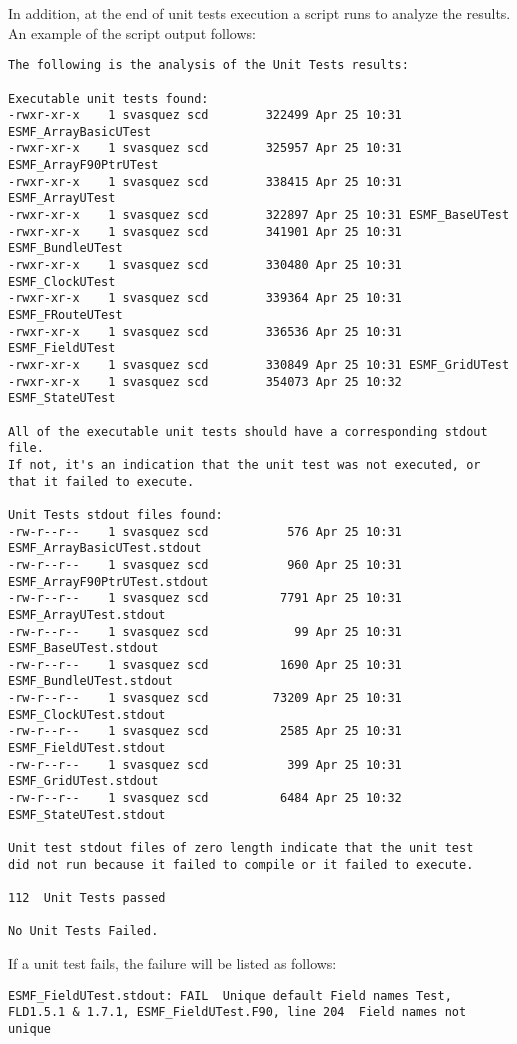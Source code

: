 In addition, at the end of unit tests execution a script runs to analyze the results.
An example of the script output follows:
\begin{verbatim}
The following is the analysis of the Unit Tests results:

Executable unit tests found:
-rwxr-xr-x    1 svasquez scd        322499 Apr 25 10:31 ESMF_ArrayBasicUTest
-rwxr-xr-x    1 svasquez scd        325957 Apr 25 10:31 ESMF_ArrayF90PtrUTest
-rwxr-xr-x    1 svasquez scd        338415 Apr 25 10:31 ESMF_ArrayUTest
-rwxr-xr-x    1 svasquez scd        322897 Apr 25 10:31 ESMF_BaseUTest
-rwxr-xr-x    1 svasquez scd        341901 Apr 25 10:31 ESMF_BundleUTest
-rwxr-xr-x    1 svasquez scd        330480 Apr 25 10:31 ESMF_ClockUTest
-rwxr-xr-x    1 svasquez scd        339364 Apr 25 10:31 ESMF_FRouteUTest
-rwxr-xr-x    1 svasquez scd        336536 Apr 25 10:31 ESMF_FieldUTest
-rwxr-xr-x    1 svasquez scd        330849 Apr 25 10:31 ESMF_GridUTest
-rwxr-xr-x    1 svasquez scd        354073 Apr 25 10:32 ESMF_StateUTest

All of the executable unit tests should have a corresponding stdout file.
If not, it's an indication that the unit test was not executed, or that it failed to execute.

Unit Tests stdout files found: 
-rw-r--r--    1 svasquez scd           576 Apr 25 10:31 ESMF_ArrayBasicUTest.stdout
-rw-r--r--    1 svasquez scd           960 Apr 25 10:31 ESMF_ArrayF90PtrUTest.stdout
-rw-r--r--    1 svasquez scd          7791 Apr 25 10:31 ESMF_ArrayUTest.stdout
-rw-r--r--    1 svasquez scd            99 Apr 25 10:31 ESMF_BaseUTest.stdout
-rw-r--r--    1 svasquez scd          1690 Apr 25 10:31 ESMF_BundleUTest.stdout
-rw-r--r--    1 svasquez scd         73209 Apr 25 10:31 ESMF_ClockUTest.stdout
-rw-r--r--    1 svasquez scd          2585 Apr 25 10:31 ESMF_FieldUTest.stdout
-rw-r--r--    1 svasquez scd           399 Apr 25 10:31 ESMF_GridUTest.stdout
-rw-r--r--    1 svasquez scd          6484 Apr 25 10:32 ESMF_StateUTest.stdout

Unit test stdout files of zero length indicate that the unit test
did not run because it failed to compile or it failed to execute. 

112  Unit Tests passed 

No Unit Tests Failed.

\end{verbatim}

If a unit test fails, the failure will be listed as follows:
\begin{verbatim}
ESMF_FieldUTest.stdout: FAIL  Unique default Field names Test, FLD1.5.1 & 1.7.1, ESMF_FieldUTest.F90, line 204  Field names not unique
\end{verbatim}


